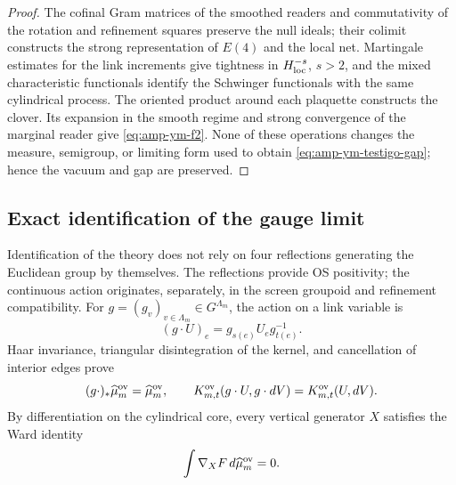 \begin{proof}
The cofinal Gram matrices of the smoothed readers and commutativity of the
rotation and refinement squares preserve the null ideals; their
colimit constructs the strong representation of \(E(4)\) and the local net.
Martingale estimates for the link increments give tightness in
\(H^{-s}_{\rm loc}\), \(s>2\), and the mixed characteristic functionals identify the
Schwinger functionals with the same cylindrical process. The oriented
product around each plaquette constructs the clover. Its expansion in
the smooth regime and strong convergence of the marginal reader give
\eqref{eq:amp-ym-f2}. None of these operations changes the measure,
semigroup, or limiting form used to obtain
\eqref{eq:amp-ym-testigo-gap}; hence the vacuum and gap are preserved.
\end{proof}

\subsection*{Exact identification of the gauge limit}

Identification of the theory does not rely on four reflections
generating the Euclidean group by themselves. The reflections provide
OS positivity; the continuous action originates, separately, in the screen
groupoid and refinement compatibility. For
\(g=(g_v)_{v\in\Lambda_m}\in G^{\Lambda_m}\), the action on a link
variable is
\begin{equation}\label{eq:amp-ym-accion-gauge-enlace}
 (g\cdot U)_e=g_{s(e)}U_e g_{t(e)}^{-1}.
\end{equation}
Haar invariance, triangular disintegration of the kernel, and
cancellation of interior edges prove
\begin{equation}\label{eq:amp-ym-invariancia-gauge-medida}
 (g\cdot)_*\widehat\mu_m^{\rm ov}=\widehat\mu_m^{\rm ov},
 \qquad
 K_{m,t}^{\rm ov}(g\cdot U,g\cdot dV)
 =K_{m,t}^{\rm ov}(U,dV).
\end{equation}
By differentiation on the cylindrical core, every vertical generator
\(X\) satisfies the Ward identity
\begin{equation}\label{eq:amp-ym-ward}
 \int \nabla_XF\,d\widehat\mu_m^{\rm ov}=0.
\end{equation}

